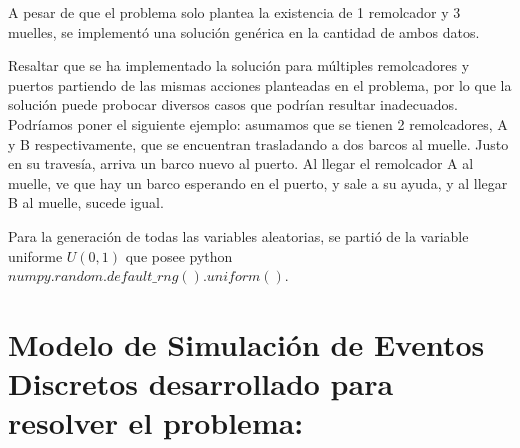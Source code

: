 \documentclass[titlepage,11pt]{scrartcl}
\begin{document}
	A pesar de que el problema solo plantea la existencia de 1 remolcador y 3 muelles, se implementó una solución genérica en la cantidad de ambos datos.

	Resaltar que se ha implementado la solución para múltiples remolcadores y puertos partiendo de las mismas acciones planteadas en el problema, por lo que la solución puede probocar diversos casos que podrían resultar inadecuados. Podríamos poner el siguiente ejemplo: asumamos que se tienen 2 remolcadores, A y B respectivamente, que se encuentran trasladando a dos barcos al muelle. Justo en su travesía, arriva un barco nuevo al puerto. Al llegar el remolcador A al muelle, ve que hay un barco esperando en el puerto, y sale a su ayuda, y al llegar B al muelle, sucede igual.

	Para la generación de todas las variables aleatorias, se partió de la variable uniforme $U(0, 1)$ que posee python $numpy.random.default\_rng().uniform()$.


\section{Modelo de Simulación de Eventos Discretos desarrollado para resolver el problema:}
\end{document}
